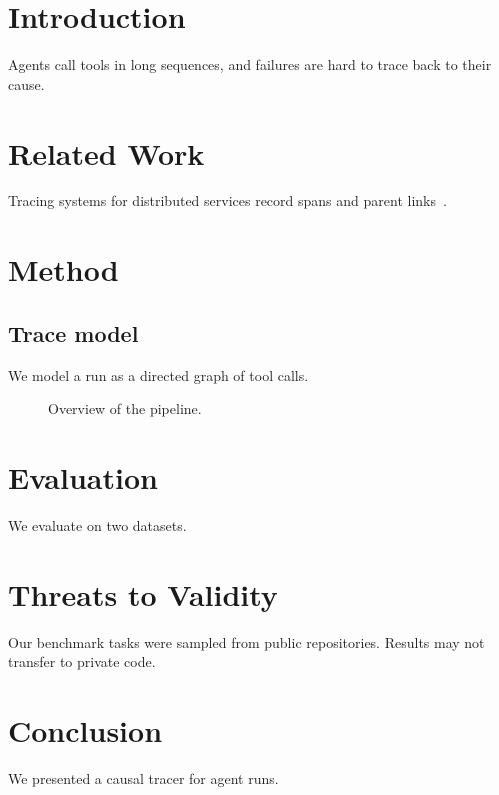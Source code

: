 \documentclass{article}
\begin{document}
\section{Introduction}
Agents call tools in long sequences, and failures are hard to trace back to their cause.

\section{Related Work}
Tracing systems for distributed services record spans and parent links~\cite{dapper}.

\section{Method}
\subsection{Trace model}
We model a run as a directed graph of tool calls.
\begin{figure}
  \centering
  \caption{Overview of the pipeline.}
  \label{fig:overview}
\end{figure}

\section{Evaluation}
We evaluate on two datasets.
\begin{table}\caption{Datasets.}\label{tab:data}\end{table}
\begin{table}\caption{Main results.}\label{tab:main}\end{table}

\section{Threats to Validity}
Our benchmark tasks were sampled from public repositories. Results may not transfer to private code.

\section{Conclusion}
We presented a causal tracer for agent runs.
\end{document}
